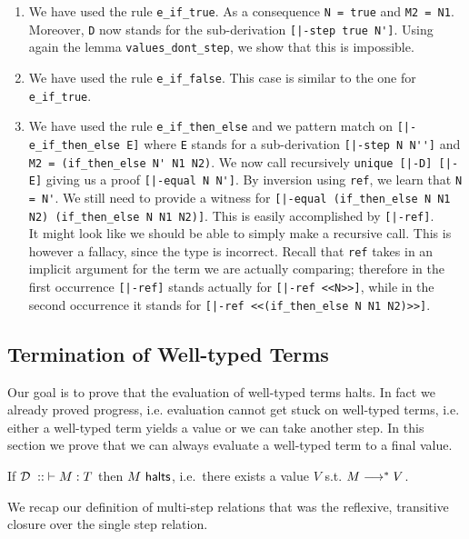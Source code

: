 \begin{enumerate}
\item We have used the rule \lstinline!e_if_true!. As a consequence
  \lstinline!N = true! and \lstinline!M2 = N1!. Moreover,
  \lstinline!D! now stands for the sub-derivation \lstinline![|-step true N']!.
  Using again the lemma \lstinline!values_dont_step!, we show that this is impossible.
\item We have used the rule \lstinline!e_if_false!. This case is similar to
  the one for \lstinline!e_if_true!.
\item We have used the rule \lstinline!e_if_then_else! and we pattern match on
\lstinline![|-e_if_then_else E]! where \lstinline!E! stands for a sub-derivation
\lstinline![|-step N N'']! and \lstinline!M2 = (if_then_else N' N1 N2)!.
We now call recursively \lstinline!unique [|-D] [|-E]! giving us a proof
\lstinline![|-equal N N']!. By inversion using \lstinline!ref!, we learn that
\lstinline!N = N'!. We still need to provide a witness for
\lstinline![|-equal (if_then_else N N1 N2) (if_then_else N N1 N2)]!. This is easily
accomplished by \lstinline![|-ref]!. \\[0.5em]
It might look like we should be able to simply make a recursive call. This is
however a fallacy, since the type is incorrect. Recall that \lstinline!ref!
takes in an implicit argument for the term we are actually comparing; therefore
in the first occurrence \lstinline![|-ref]! stands actually for
\lstinline![|-ref <<N>>]!, while in the second occurrence it %
stands for \lstinline![|-ref <<(if_then_else N N1 N2)>>]!.
\end{enumerate}


\subsection{Termination of Well-typed Terms}
Our goal is to prove that the evaluation of well-typed terms halts. In
fact we already proved progress, i.e. evaluation cannot get stuck on
well-typed terms, i.e. either a well-typed term yields a value or we
can take another step. In this section we prove that we can always
evaluate a well-typed term to a final value.

\begin{theorem}
If $\mathbin{{\mathcal{D}} \; :: \;  \vdash M : T }$ then $M ~\mathsf{halts}$, i.e.~there exists a value $V$ s.t. $M
\longrightarrow^* V$.
\end{theorem}

We recap our definition of multi-step relations that was the
reflexive, transitive closure over the single step relation.

